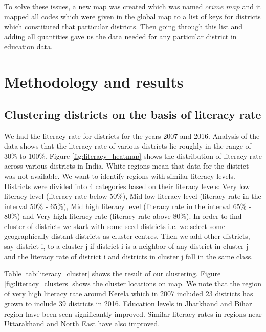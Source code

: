 \documentclass[twoside]{article}
\begin{document}
To solve these issues, a new map was created which was named $crime\_map$ and it mapped all codes which were given in the global map to a list of keys for districts which constituted that particular districts. Then going through this list and adding all quantities gave us the data needed for any particular district in education data.


\vspace*{-0.6cm}
\section*{Methodology and results}

\vspace*{-0.4cm}
\subsection*{Clustering districts on the basis of literacy rate}
We had the literacy rate for districts for the years 2007 and 2016. Analysis of the data shows that the literacy rate of various districts lie roughly in the range of 30\% to 100\%. Figure \ref{fig:literacy_heatmap} shows the distribution of literacy rate across various districts in India. White regions mean that data for the district was not available. We want to identify regions with similar literacy levels.\\

Districts were divided into 4 categories based on their literacy levels: Very low literacy level (literacy rate below 50\%), Mid low literacy level (literacy rate in the interval 50\% - 65\%), Mid high literacy level (literacy rate in the interval 65\% - 80\%) and Very high literacy rate (literacy rate above 80\%). In order to find cluster of districts we start with some seed districts i.e. we select some geographically distant districts as cluster centres. Then we add other districts, say district i, to a cluster j if district i is a neighbor of any district in cluster j and the literacy rate of district i and districts in cluster j fall in the same class.

Table \ref{tab:literacy_cluster} shows the result of our clustering. Figure \ref{fig:literacy_clusters} shows the cluster locations on map. We note that the region of very high literacy rate around Kerela which in 2007 included 23 districts has grown to include 39 districts in 2016. Education levels in Jharkhand and Bihar region have been seen significantly improved. Similar literacy rates in regions near Uttarakhand and North East have also improved. 
\end{document}
